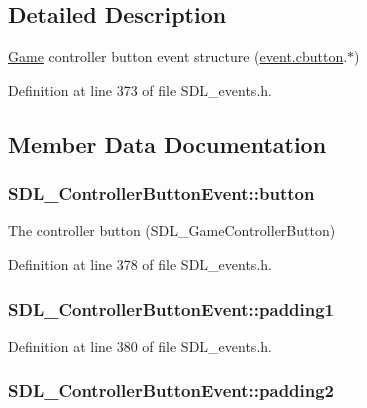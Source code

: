 \subsection{Detailed Description}
\hyperlink{class_game}{Game} controller button event structure (\hyperlink{union_s_d_l___event_aee2b5671c8dcdb447023715cc21593cb}{event.\-cbutton}.$\ast$) 

Definition at line 373 of file S\-D\-L\-\_\-events.\-h.



\subsection{Member Data Documentation}
\hypertarget{struct_s_d_l___controller_button_event_a039da6cd31c3c62e62a3ae17cc64d0db}{
\subsubsection[{button}]{ S\-D\-L\-\_\-\-Controller\-Button\-Event\-::button}}\label{struct_s_d_l___controller_button_event_a039da6cd31c3c62e62a3ae17cc64d0db}
The controller button (S\-D\-L\-\_\-\-Game\-Controller\-Button) 

Definition at line 378 of file S\-D\-L\-\_\-events.\-h.

\hypertarget{struct_s_d_l___controller_button_event_a34d3e43fc1994288b9b083c874bc0899}{
\subsubsection[{padding1}]{ S\-D\-L\-\_\-\-Controller\-Button\-Event\-::padding1}}\label{struct_s_d_l___controller_button_event_a34d3e43fc1994288b9b083c874bc0899}


Definition at line 380 of file S\-D\-L\-\_\-events.\-h.

\hypertarget{struct_s_d_l___controller_button_event_a8caf56a3921227913cfb652d5de1eec4}{
\subsubsection[{padding2}]{ S\-D\-L\-\_\-\-Controller\-Button\-Event\-::padding2}}\label{struct_s_d_l___controller_button_event_a8caf56a3921227913cfb652d5de1eec4}


